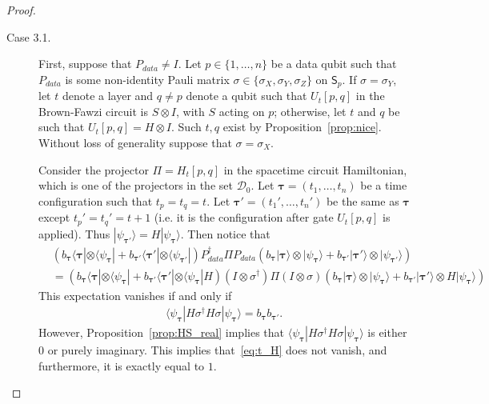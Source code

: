 \documentclass[11pt,letterpaper]{article}
\theoremstyle{definition}
\theoremstyle{remark}
\newcommand{\Paren}[1]{\left(#1\right)}
\newcommand{\cD}{\mathcal D}
\numberwithin{equation}{section}
\theoremstyle{definition}
\newcommand{\ket}[1]{|#1\rangle}
\newcommand{\bra}[1]{\langle#1|}
\newcommand{\sS}{{\mathsf{S}}}
\newcommand{\timeconfig}{{\bm{\tau}}}
\begin{document}
\begin{proof}
\begin{description}
  \begin{description}
  
  \item[Case 3.1.] First, suppose that $P_{data} \neq I$. Let $p \in \{1,\ldots,n\}$ be a data qubit such that $P_{data}$ is some non-identity Pauli matrix $\sigma \in \{ \sigma_X ,\sigma_Y, \sigma_Z\}$ on $\sS_p$. If $\sigma = \sigma_Y$, let $t$ denote a layer and $q \neq p$ denote a qubit such that $U_t[p,q]$ in the Brown-Fawzi circuit is $S \otimes I$, with $S$ acting on $p$; otherwise, let $t$ and $q$ be such that $U_t[p,q] = H \otimes I$. Such $t,q$ exist by Proposition~\ref{prop:nice}. Without loss of generality suppose that $\sigma = \sigma_X$.
  
%
  
  Consider the projector $\Pi = H_t[p,q]$ in the spacetime circuit Hamiltonian, which is one of the projectors in the set $\cD_0$. Let $\timeconfig = (t_1,\ldots,t_n)$ be a time configuration such that $t_p = t_q = t$. Let $\timeconfig' = (t_1',\ldots,t_n')$ be the same as $\timeconfig$ except $t_p' = t_q' = t+1$ (i.e. it is the configuration after gate $U_t[p,q]$ is applied). Thus $\ket{\psi_{\timeconfig'}} = H \ket{\psi_\timeconfig}$. Then notice that
  \begin{align}
    &\Paren{ b_{\timeconfig} \bra{\timeconfig} \otimes \bra{\psi_\timeconfig}+ b_{\timeconfig'} \bra{\timeconfig'} \otimes \bra{\psi_{\timeconfig'}}  } P_{data}^\dagger \Pi P_{data} \Paren{ b_{\timeconfig} \ket{\timeconfig} \otimes \ket{\psi_\timeconfig}  + b_{\timeconfig'} \ket{\timeconfig'} \otimes \ket{\psi_{\timeconfig'}} } \label{eq:t_H}\\
    &= \Paren{ b_{\timeconfig} \bra{\timeconfig} \otimes \bra{\psi_\timeconfig} + b_{\timeconfig'} \bra{\timeconfig'} \otimes \bra{\psi_{\timeconfig}} H} (I \otimes \sigma^\dagger ) \Pi (I \otimes \sigma) \Paren{ b_{\timeconfig} \ket{\timeconfig} \otimes \ket{\psi_\timeconfig}  + b_{\timeconfig'} \ket{\timeconfig'} \otimes  H \ket{\psi_{\timeconfig}} }
  \end{align}
  This expectation vanishes if and only if
  \begin{align}
    \bra{\psi_\timeconfig} H \sigma^\dagger H \sigma \ket{\psi_\timeconfig} = b_{\timeconfig} b_{\timeconfig'}.
  \end{align}
  However, Proposition~\ref{prop:HS_real} implies that $\bra{\psi_\timeconfig}H \sigma^\dagger H \sigma \ket{\psi_\timeconfig}$ is either 0 or purely imaginary. This implies that~\eqref{eq:t_H} does not vanish, and furthermore, it is exactly equal to $1$.
  

\end{description}
\end{description}
\end{proof}
\end{document}
